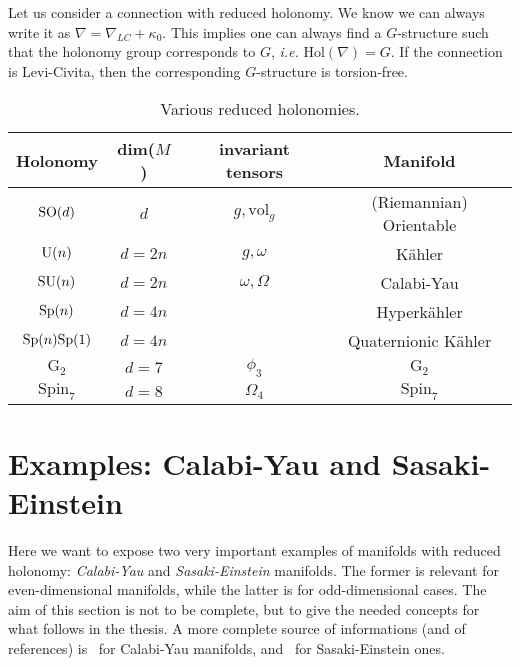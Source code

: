 \documentclass[debug]{phd}
\begin{document}
					Let us consider a connection with reduced holonomy. 
					We know we can always write it as $\nabla = \nabla_{LC} + \kappa_0$.
					This implies one can always find a $G$-structure such that the holonomy group corresponds to $G$, \emph{i.e.} $\mathrm{Hol}(\nabla) = G$.
					If the connection is Levi-Civita, then the corresponding $G$-structure is torsion-free.
							\begin{table}[h!]
							\centering
								\begin{tabular}{c | c | c | c}
									Holonomy					&			dim($M$)							&	invariant tensors		&	Manifold				\\
									\midrule
									$\mathrm{SO}(d)$					& 			$d$								&	$g, \mathrm{vol}_g$		&	(Riemannian) Orientable	\\[1.2mm]
									$\mathrm{U}(n) $	 				&			$d = 2n$							&	$g, \omega$			&	K\"ahler				\\[1.2mm]
									$\mathrm{SU}(n)$		 			&			$d = 2n$							&	$\omega, \Omega$		&	Calabi-Yau			\\[1.2mm]
									$\mathrm{Sp}(n)$		 			&			$d = 4n$							&						&	Hyperk\"ahler			\\[1.2mm]
									$\mathrm{Sp}(n) \mathrm{Sp}(1)$				&			$d = 4n$							&						&	Quaternionic K\"ahler	\\[1.2mm]
									$\mathrm{G}_2$		 	&			$d = 7$							&		$\phi_3$			&	$\mathrm{G}_2$		\\[1.2mm]
									$\mathrm{Spin}_7$		 	&			$d = 8$							&		$\Omega_4$		&	$\mathrm{Spin}_7$		\\
									\bottomrule
								\end{tabular}
								\caption{Various reduced holonomies.}
								\label{tabhol}
							\end{table}
			\section{Examples: Calabi-Yau and Sasaki-Einstein}
			\label{CYSE}
				Here we want to expose two very important examples of manifolds with reduced holonomy: \emph{Calabi-Yau} and \emph{Sasaki-Einstein} manifolds.
				The former is relevant for even-dimensional manifolds, while the latter is for odd-dimensional cases.
				The aim of this section is not to be complete, but to give the needed concepts for what follows in the thesis.
				A more complete source of informations (and of references) is~\cite{CalabiYauReview} for Calabi-Yau manifolds, and~\cite{SparksSE} for Sasaki-Einstein ones.
				
\end{document}
